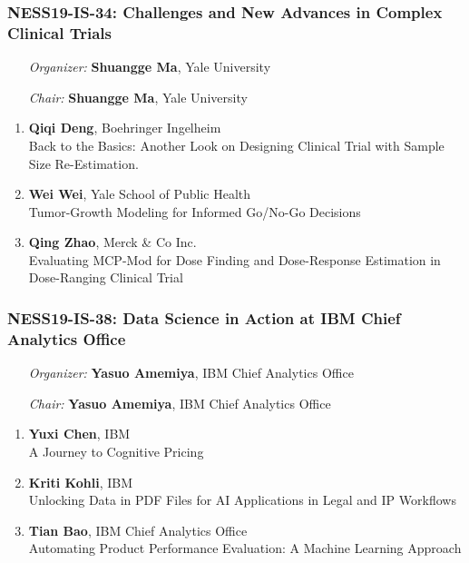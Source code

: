 \subsubsection*{NESS19-IS-34: Challenges and New Advances in Complex Clinical Trials}

\begin{enumerate}[align=left]
\item [\emph{Organizer:}] \textbf{Shuangge Ma}, Yale University \\
\item [\emph{Chair:}] \textbf{Shuangge Ma}, Yale University
\end{enumerate}

\begin{enumerate}
\item \textbf{Qiqi Deng}, Boehringer Ingelheim \\
Back to the Basics: Another Look on Designing Clinical Trial with Sample Size Re-Estimation.
\item \textbf{Wei Wei}, Yale School of Public Health \\
Tumor-Growth Modeling for Informed Go/No-Go Decisions
\item \textbf{Qing Zhao}, Merck \& Co Inc. \\
Evaluating MCP-Mod for Dose Finding and Dose-Response Estimation in Dose-Ranging Clinical Trial
\end{enumerate}

\subsubsection*{NESS19-IS-38: Data Science in Action at IBM Chief Analytics Office}

\begin{enumerate}[align=left]
\item [\emph{Organizer:}] \textbf{Yasuo Amemiya}, IBM Chief Analytics Office \\
\item [\emph{Chair:}] \textbf{Yasuo Amemiya}, IBM Chief Analytics Office
\end{enumerate}

\begin{enumerate}
\item \textbf{Yuxi Chen}, IBM \\
A Journey to Cognitive Pricing
\item \textbf{Kriti Kohli}, IBM \\
Unlocking Data in PDF Files for AI Applications in Legal and IP Workflows
\item \textbf{Tian Bao}, IBM Chief Analytics Office \\
Automating Product Performance Evaluation: A Machine Learning Approach
\end{enumerate}

